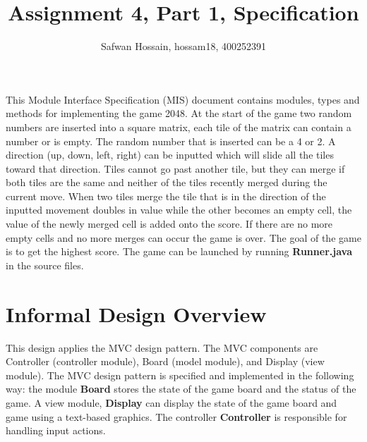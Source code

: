 \documentclass[12pt]{article}
\title{Assignment 4, Part 1, Specification}
\author{Safwan Hossain, hossam18, 400252391}
\newcommand{\authornote}[3]{\textcolor{#1}{[#3 ---#2]}}
\newcommand{\authornote}[3]{}
\newcommand{\wss}[1]{\authornote{blue}{SS}{#1}}
\begin{document}
\maketitle
This Module Interface Specification (MIS) document contains modules, types and
methods for implementing the game 2048. At the start of the game two random numbers are inserted into a square matrix, each tile of the matrix can contain a number or is empty. The random number that is inserted can be a 4 or 2. A direction (up, down, left, right) can be inputted which will slide all the tiles toward that direction. Tiles cannot go past another tile, but they can merge if both tiles are the same and neither of the tiles recently merged during the current move. When two tiles merge the tile that is in the direction of the inputted movement doubles in value while the other becomes an empty cell, the value of the newly merged cell is added onto the score. If there are no more empty cells and no more merges can occur the game is over. The goal of the game is to get the highest score. The game can be launched by running \textbf{Runner.java} in the source files.





% 
% 

\newpage
\section* {Informal Design Overview}
This design applies the MVC design pattern. The MVC components are Controller (controller module), Board (model module), and Display (view module). The MVC design pattern is specified and implemented in the following way: the module \textbf{Board} stores the state of the game board and the status of the game. A view module, \textbf{Display} can display the state of the game board and game using a text-based graphics. The controller \textbf{Controller} is responsible for handling input actions.
\end{document}
